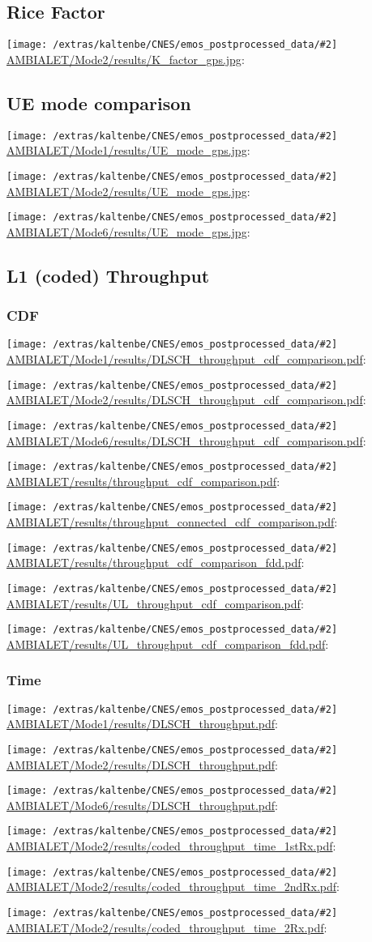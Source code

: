 \documentclass[a4paper,10pt]{article}
\newcommand{\printfile}[2][]{
 \begin{minipage}{8cm}
  \centering
  \texttt{[image: /extras/kaltenbe/CNES/emos\_postprocessed\_data/\#2]}
  \url{#2}: #1

 \end{minipage}
}
\begin{document}
\subsection{Rice Factor}

\printfile{AMBIALET/Mode2/results/K_factor_gps.jpg}

\subsection{UE mode comparison}

\printfile{AMBIALET/Mode1/results/UE_mode_gps.jpg}
\printfile{AMBIALET/Mode2/results/UE_mode_gps.jpg}

\printfile{AMBIALET/Mode6/results/UE_mode_gps.jpg}

\subsection{L1 (coded) Throughput}


\subsubsection{CDF}

\printfile{AMBIALET/Mode1/results/DLSCH_throughput_cdf_comparison.pdf}
\printfile{AMBIALET/Mode2/results/DLSCH_throughput_cdf_comparison.pdf}

\printfile{AMBIALET/Mode6/results/DLSCH_throughput_cdf_comparison.pdf}

\printfile{AMBIALET/results/throughput_cdf_comparison.pdf}
\printfile{AMBIALET/results/throughput_connected_cdf_comparison.pdf}

\printfile{AMBIALET/results/throughput_cdf_comparison_fdd.pdf}

\printfile{AMBIALET/results/UL_throughput_cdf_comparison.pdf}
\printfile{AMBIALET/results/UL_throughput_cdf_comparison_fdd.pdf}

\subsubsection{Time}

\printfile{AMBIALET/Mode1/results/DLSCH_throughput.pdf}
\printfile{AMBIALET/Mode2/results/DLSCH_throughput.pdf}

\printfile{AMBIALET/Mode6/results/DLSCH_throughput.pdf}
\printfile{AMBIALET/Mode2/results/coded_throughput_time_1stRx.pdf}

\printfile{AMBIALET/Mode2/results/coded_throughput_time_2ndRx.pdf}
\printfile{AMBIALET/Mode2/results/coded_throughput_time_2Rx.pdf}
\end{document}
